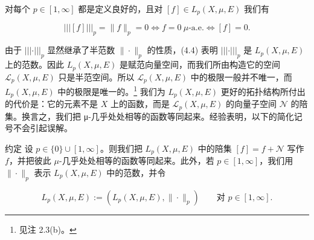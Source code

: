对每个 $ p \in [1,\infty] $ 都是定义良好的，且对 $ [f] \in L_p(X,\mu,E) $ 我们有

\begin{equation}
|||[f]|||_p = \|f\|_p = 0 \iff f = 0 \ \mu\text{-a.e.} \iff [f] = 0 .\tag{4.4}
\end{equation}

由于 $ |||\cdot|||_p $ 显然继承了半范数 $ \|\cdot\|_p $ 的性质，(4.4) 表明 $ |||\cdot|||_p $ 是 $ L_p(X,\mu,E) $ 上的范数。因此 $ L_p(X,\mu,E) $ 是赋范向量空间，而我们所由构造它的空间 $ \mathcal{L}_p(X,\mu,E) $ 只是半范空间。所以 $ \mathcal{L}_p(X,\mu,E) $ 中的极限一般并不唯一，而 $ L_p(X,\mu,E) $ 中的极限是唯一的。\footnote{见注 2.3(b)。} 我们为 $ L_p(X,\mu,E) $ 更好的拓扑结构所付出的代价是：它的元素不是 $ X $ 上的函数，而是 $ \mathcal{L}_p(X,\mu,E) $ 的向量子空间 $ \mathcal{N} $ 的陪集。换言之，我们把 μ-几乎处处相等的函数等同起来。经验表明，以下的简化记号不会引起误解。

约定 设 $ p \in \{0\} \cup [1, \infty] $。则我们把 $ L_p(X, \mu, E) $ 中的陪集 $ [f] = f + \mathcal{N} $ 写作 $ f $，并把彼此 $ \mu $-几乎处处相等的函数等同起来。此外，若 $ p \in [1, \infty] $，我们用 $ \|\cdot\|_p $ 表示 $ L_p(X, \mu, E) $ 中的范数，并令

\[
L_p(X, \mu, E) := (L_p(X, \mu, E), \|\cdot\|_p) \qquad \text{对 } p \in [1, \infty] .
\]

